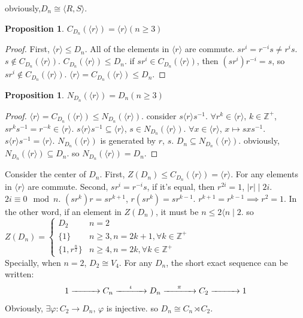 \documentclass[10pt,a4paper]{article}
\newtheorem{proposition}[theorem]{Proposition}
\begin{document}
obviously,$D_{n}\cong\langle R,S\rangle$.
\begin{proposition}
    $C_{D_{n}}(\langle r\rangle)=\langle r\rangle(n\ge 3)$
\end{proposition}
\begin{proof}
    First, $\langle r\rangle\le D_{n}$. All of the elements in $\langle r\rangle$ are commute. $sr^i=r^{-i}s\ne r^{i}s$.
    $s\notin C_{D_n}(\langle r\rangle)$. $C_{D_n}(\langle r\rangle)\le D_n$. if $sr^{i}\in C_{D_n}(\langle r\rangle)$, then $(sr^{i})r^{-i}=s$, so $sr^i\notin C_{D_n}(\langle r\rangle)$.
    $\langle r\rangle=C_{D_n}(\langle r\rangle)\le D_n$.
\end{proof}
\begin{proposition}
    $N_{D_n}(\langle r\rangle)=D_n(n\ge 3)$
\end{proposition}
\begin{proof}
    $\langle r\rangle=C_{D_n}(\langle r\rangle)\le N_{D_n}(\langle r\rangle)$. consider $s\langle r\rangle s^{-1}$. $\forall r^k\in\langle r\rangle$, $k\in\mathbb{Z}^+$, $sr^ks^{-1}=r^{-k}\in\langle r\rangle$.
    $s\langle r\rangle s^{-1}\subseteq\langle r\rangle$, $s\in N_{D_n}(\langle r\rangle)$. $\forall x\in\langle r\rangle$, $x\mapsto sxs^{-1}$. $s\langle r\rangle s^{-1}=\langle r\rangle$.
    $N_{D_n}(\langle r\rangle)$ is generated by $r$, $s$. $D_n\subseteq N_{D_n}(\langle r\rangle)$. obviously, $N_{D_n}(\langle r\rangle)\subseteq D_n$. so $N_{D_n}(\langle r\rangle)=D_n$.
\end{proof}
Consider the center of $D_n$. First, $Z(D_n)\le C_{D_n}(\langle r\rangle)=\langle r\rangle$. For any elements in $\langle r\rangle$ are commute. Second, $sr^i=r^{-i}s$, if it's equal, then $r^{2i}=1$, $|r|\mid 2i$.
$2i\equiv0\mod n$. $(sr^{k})r=sr^{k+1}$, $r(sr^{k})=sr^{k-1}$. $r^{k+1}=r^{k-1}\implies r^{2}=1$. In the other word, if an element in $Z(D_n)$, it must be $n\le 2\langle n\mid 2$. so\\
$Z(D_n)=\begin{cases}D_2&n=2\\\{1\}&n\ge3,n=2k+1,\forall k\in\mathbb{Z}^+\\\{1,r^{\frac{n}{2}}\}&n\ge4,n=2k,\forall k\in\mathbb{Z}^+\end{cases}$\\
Specially, when $n=2$, $D_2\cong V_4$.
For any $D_n$, the short exact sequence can be written:
\[1\xrightarrow{\hspace{1cm}}C_n\xrightarrow{\hspace{0.5cm}\iota\hspace{0.5cm}}D_{n}\xrightarrow{\hspace{0.5cm}\pi\hspace{0.5cm}}C_2\xrightarrow{\hspace{1cm}}1\]
Obviously, $\exists\varphi:C_2\to D_n$, $\varphi$ is injective. so $D_n\cong C_n\rtimes C_2$.
\end{document}
